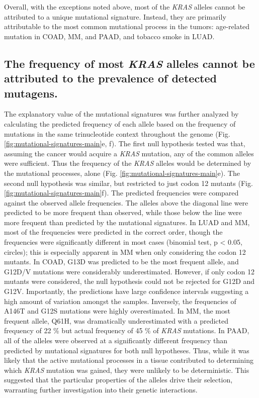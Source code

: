 \documentclass[english, 12pt, letterpaper]{article}
\newcommand{\KRAS}{\emph{KRAS}}
\begin{document}
Overall, with the exceptions noted above, most of the \KRAS{} alleles cannot be attributed to a unique mutational signature. 
Instead, they are primarily attributable to the most common mutational process in the tumors: age-related mutation in COAD, MM, and PAAD, and tobacco smoke in LUAD.


\subsection*{The frequency of most \KRAS{} alleles cannot be attributed to the prevalence of detected mutagens.}

The explanatory value of the mutational signatures was further analyzed by calculating the predicted frequency of each allele based on the frequency of mutations in the same trinucleotide context throughout the genome (Fig. \ref{fig:mutational-signatures-main}e, f).
The first null hypothesis tested was that, assuming the cancer would acquire a \KRAS{} mutation, any of the common alleles were sufficient. Thus the frequency of the \KRAS{} alleles would be determined by the mutational processes, alone (Fig. \ref{fig:mutational-signatures-main}e).
The second null hypothesis was similar, but restricted to just codon 12 mutants (Fig. \ref{fig:mutational-signatures-main}f).
The predicted frequencies were compared against the observed allele frequencies.
The alleles above the diagonal line were predicted to be more frequent than observed, while those below the line were more frequent than predicted by the mutational signatures.
In LUAD and MM, most of the frequencies were predicted in the correct order, though the frequencies were significantly different in most cases (binomial test, p < 0.05, circles); this is especially apparent in MM when only considering the codon 12 mutants.
In COAD, G13D was predicted to be the most frequent allele, and G12D/V mutations were considerably underestimated.
However, if only codon 12 mutants were considered, the null hypothesis could not be rejected for G12D and G12V.
Importantly, the predictions have large confidence intervals suggesting a high amount of variation amongst the samples.
Inversely, the frequencies of A146T and G12S mutations were highly overestimated.
In MM, the most frequent allele, Q61H, was dramatically underestimated with a predicted frequency of 22 \% but actual frequency of 45 \% of \KRAS{} mutations.
In PAAD, all of the alleles were observed at a significantly different frequency than predicted by mutational signatures for both null hypotheses.
Thus, while it was likely that the active mutational processes in a tissue contributed to determining which \KRAS{} mutation was gained, they were unlikely to be deterministic.
This suggested that the particular properties of the alleles drive their selection, warranting further investigation into their genetic interactions.
\end{document}
